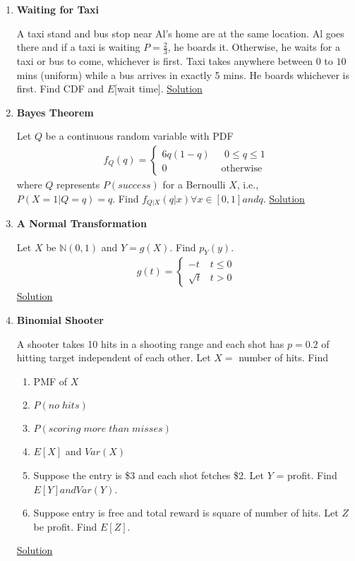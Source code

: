 \documentclass[11pt, a4paper]{article}
\begin{document}
\begin{enumerate}
    \item \hypertarget{q_waittaxi}{\textbf{Waiting for Taxi}}\newline
    A taxi stand and bus stop near Al's home are at the same location. Al goes there and if a taxi is waiting $P=\frac{2}{3}$, he boards it. Otherwise, he waits for a taxi or bus to come, whichever is first. Taxi takes anywhere between $0$ to $10$ mins (uniform) while a bus arrives in exactly 5 mins. He boards whichever is first. Find CDF and $E$[wait time]. \hyperlink{a_waittaxi}{Solution}
    
    \item \hypertarget{q_bayes}{\textbf{Bayes Theorem}}\newline
    Let $Q$ be a continuous random variable with PDF
    \begin{align*}
        f_{Q}(q) = \begin{cases} 6q(1-q) &\mbox{ $0 \leq q \leq 1$}\\
                                 0 &\mbox{ otherwise} \end{cases}
    \end{align*}
    where $Q$ represents $P(success)$ for a Bernoulli $X$, i.e., $P(X=1|Q=q) = q$. Find $f_{Q|X}(q|x) \forall x \in [0,1] and q$. \hyperlink{a_bayes}{Solution}
    
    \item \hypertarget{q_normaltr}{\textbf{A Normal Transformation}}\newline
    Let $X$ be $\mathbb{N}(0,1)$ and $Y = g(X)$. Find $p_{Y}(y)$. 
    \begin{align*}
        g(t) = \begin{cases} -t &\mbox{$t \leq 0$}\\
                            \sqrt{t} &\mbox{$t > 0$} \end{cases}
    \end{align*}
    \hyperlink{a_normaltr}{Solution}

    \item \hypertarget{q_binshoot}{\textbf{Binomial Shooter}}\newline
    A shooter takes 10 hits in a shooting range and each shot has $p=0.2$ of hitting target independent of each other. Let $X = $ number of hits. Find
    \begin{enumerate}
         \item PMF of $X$
         \item $P(no\;hits)$
         \item $P(scoring\;more\;than\;misses)$
         \item $E[X]$ and $Var(X)$
         \item Suppose the entry is \$3 and each shot fetches \$2. Let $Y$ = profit. Find $E[Y] and Var(Y)$.
         \item Suppose entry is free and total reward is square of number of hits. Let $Z$ be profit. Find $E[Z]$.
    \end{enumerate} \hyperlink{a_binshoot}{Solution}


\end{enumerate}
\end{document}
